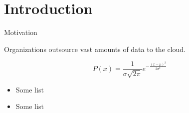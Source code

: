 \section{Introduction}

	\begin{frame}{Motivation}

		Organizations outsource vast amounts of data to the cloud.
		



			\[
				P(x) = \frac{1}{{\sigma \sqrt{ 2 \pi } }} e^{ - \frac{(x - \mu)^2}{2 \sigma^2} }
			\]


		\begin{itemize}
			\item Some list
			\item Some list
		\end{itemize}


	\end{frame}

